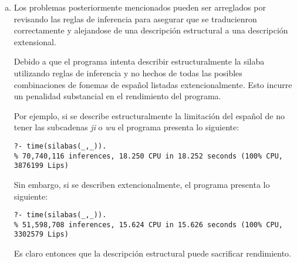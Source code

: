 \documentclass[12pt]{article}
\begin{document}
\begin{enumerate}[a)]
    \item Los problemas posteriormente mencionados pueden ser arreglados por revisando las reglas de inferencia para asegurar que se traducienron correctamente y alejandose de una descripción estructural a una descripción extensional.

          Debido a que el programa intenta describir estructuralmente la silaba utilizando reglas de inferencia y no hechos de todas las posibles combinaciones de fonemas de español listadas extencionalmente. Esto incurre un penalidad substancial en el rendimiento del programa.

          Por ejemplo, si se describe estructuralmente la limitación del español de no tener las subcadenas \textit{ji} o \textit{wu} el programa presenta lo siguiente:
          \begin{lstlisting}
?- time(silabas(_,_)).
% 70,740,116 inferences, 18.250 CPU in 18.252 seconds (100% CPU, 3876199 Lips)
    \end{lstlisting}
          Sin embargo, si se describen extencionalmente, el programa presenta lo siguiente:
          \begin{lstlisting}
?- time(silabas(_,_)).
% 51,598,708 inferences, 15.624 CPU in 15.626 seconds (100% CPU, 3302579 Lips)
    \end{lstlisting}

          Es claro entonces que la descripción estructural puede sacrificar rendimiento.
\end{enumerate}
\end{document}
